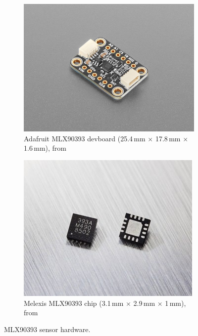 \begin{figure}[ht]
    \centering
    \begin{subfigure}[b]{0.45\textwidth}
        \centering
        \includegraphics[width=\linewidth]{figures/mlx90393}
        \caption{Adafruit MLX90393 devboard (25.4\,mm $\times$ 17.8\,mm $\times$ 1.6\,mm), from~\cite{MLX90393}}
    \end{subfigure}
    \hfill
    \begin{subfigure}[b]{0.45\textwidth}
        \centering
        \includegraphics[width=\linewidth]{figures/mlx90393-chip}
        \caption{Melexis MLX90393 chip (3.1\,mm $\times$ 2.9\,mm $\times$ 1\,mm), from~\cite{MLX90393}}
    \end{subfigure}
    \caption{MLX90393 sensor hardware.}
    \label{fig:sensor}
\end{figure}

